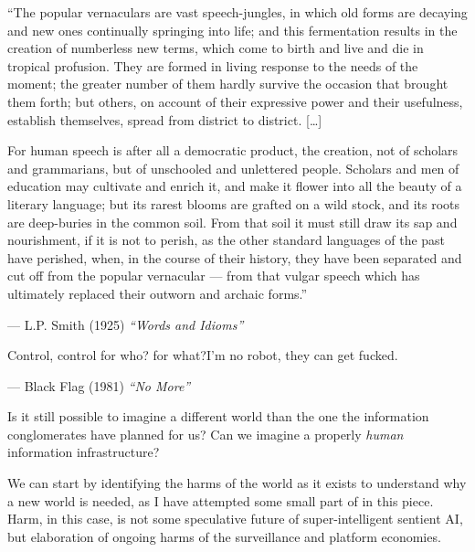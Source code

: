 \documentclass{article}
\renewenvironment{leftbar}
{\vspace{6pt}\def\FrameCommand{\hspace{0em}\vrule width 0.5pt \hspace{1em}}\MakeFramed {\advance\hsize-\width \FrameRestore}}
{\endMakeFramed}
\begin{document}
\begin{leftbar}
``The popular vernaculars are vast speech-jungles, in which old forms
are decaying and new ones continually springing into life; and this
fermentation results in the creation of numberless new terms, which come
to birth and live and die in tropical profusion. They are formed in
living response to the needs of the moment; the greater number of them
hardly survive the occasion that brought them forth; but others, on
account of their expressive power and their usefulness, establish
themselves, spread from district to district. {[}\ldots{]}

For human speech is after all a democratic product, the creation, not of
scholars and grammarians, but of unschooled and unlettered people.
Scholars and men of education may cultivate and enrich it, and make it
flower into all the beauty of a literary language; but its rarest blooms
are grafted on a wild stock, and its roots are deep-buries in the common
soil. From that soil it must still draw its sap and nourishment, if it
is not to perish, as the other standard languages of the past have
perished, when, in the course of their history, they have been separated
and cut off from the popular vernacular --- from that vulgar speech
which has ultimately replaced their outworn and archaic forms.''

--- L.P. Smith (1925) \emph{``Words and Idioms''} \cite{smithWordsIdiomsStudies1925} 
\end{leftbar}

\begin{leftbar}
Control, control for who? for what?I'm no robot, they can get fucked.

--- Black Flag (1981) \emph{``No More''}
\end{leftbar}

Is it still possible to imagine a different world than the one the
information conglomerates have planned for us? Can we imagine a properly
\emph{human} information infrastructure?

We can start by identifying the harms of the world as it exists to
understand why a new world is needed, as I have attempted some small
part of in this piece. Harm, in this case, is not some speculative
future of super-intelligent sentient AI, but elaboration of ongoing
harms of the surveillance and platform economies.
\end{document}
